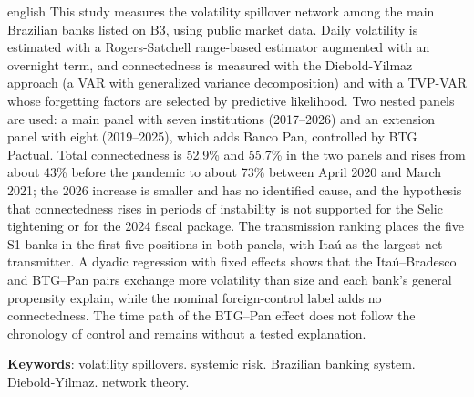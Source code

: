 \documentclass[12pt, a4paper, oneside, english, brazil]{abntex2}
\begin{document}
\begin{resumo}[Abstract]
\begin{otherlanguage*}{english}
This study measures the volatility spillover network among the main Brazilian banks listed on
B3, using public market data. Daily volatility is estimated with a Rogers-Satchell range-based
estimator augmented with an overnight term, and connectedness is measured with the
Diebold-Yilmaz approach (a VAR with generalized variance decomposition) and with a TVP-VAR whose
forgetting factors are selected by predictive likelihood. Two nested panels are used: a main
panel with seven institutions (2017--2026) and an extension panel with eight (2019--2025),
which adds Banco Pan, controlled by BTG Pactual. Total connectedness is 52.9\% and 55.7\% in the
two panels and rises from about 43\% before the pandemic to about 73\% between April 2020 and
March 2021; the 2026 increase is smaller and has no identified cause, and the hypothesis that
connectedness rises in periods of instability is not supported for the Selic tightening or for
the 2024 fiscal package. The transmission ranking places the five S1 banks in the first five
positions in both panels, with Itaú as the largest net transmitter. A dyadic regression with
fixed effects shows that the Itaú--Bradesco and BTG--Pan pairs exchange more volatility than
size and each bank's general propensity explain, while the nominal foreign-control label adds
no connectedness. The time path of the BTG--Pan effect does not follow the chronology of
control and remains without a tested explanation.

\vspace{\onelineskip}
\noindent
\textbf{Keywords}: volatility spillovers. systemic risk. Brazilian banking system.
Diebold-Yilmaz. network theory.
\end{otherlanguage*}
\end{resumo}

\listoffigures*
\cleardoublepage

\listoftables*
\cleardoublepage

\tableofcontents*
\cleardoublepage

\textual

\end{document}
